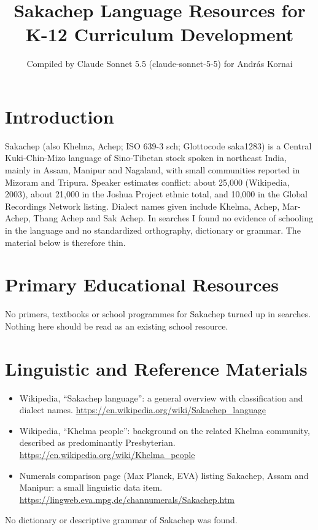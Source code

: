 \documentclass[12pt]{article}
\title{Sakachep Language Resources for K-12 Curriculum Development}
\author{Compiled by Claude Sonnet 5.5 (claude-sonnet-5-5) for Andr\'as Kornai}
\date{}
\begin{document}
\maketitle

\section{Introduction}
Sakachep (also Khelma, Achep; ISO 639-3 sch; Glottocode saka1283) is a Central Kuki-Chin-Mizo language of Sino-Tibetan stock spoken in northeast India, mainly in Assam, Manipur and Nagaland, with small communities reported in Mizoram and Tripura. Speaker estimates conflict: about 25,000 (Wikipedia, 2003), about 21,000 in the Joshua Project ethnic total, and 10,000 in the Global Recordings Network listing. Dialect names given include Khelma, Achep, Mar-Achep, Thang Achep and Sak Achep. In searches I found no evidence of schooling in the language and no standardized orthography, dictionary or grammar. The material below is therefore thin.

\section{Primary Educational Resources}
No primers, textbooks or school programmes for Sakachep turned up in searches. Nothing here should be read as an existing school resource.

\section{Linguistic and Reference Materials}
\begin{itemize}
\item Wikipedia, ``Sakachep language'': a general overview with classification and dialect names. \url{https://en.wikipedia.org/wiki/Sakachep_language}
\item Wikipedia, ``Khelma people'': background on the related Khelma community, described as predominantly Presbyterian. \url{https://en.wikipedia.org/wiki/Khelma_people}
\item Numerals comparison page (Max Planck, EVA) listing Sakachep, Assam and Manipur: a small linguistic data item. \url{https://lingweb.eva.mpg.de/channumerals/Sakachep.htm}
\end{itemize}
No dictionary or descriptive grammar of Sakachep was found.
\end{document}
